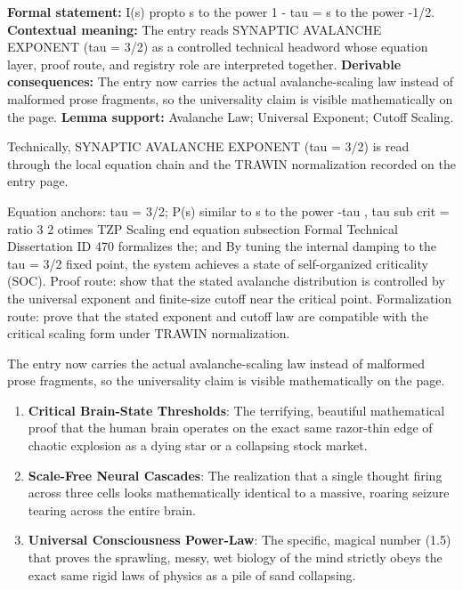 \begingroup\footnotesize\setlength{\emergencystretch}{3em}\sloppy
\textbf{Formal statement:} I(s) propto s to the power 1 - tau = s to the power -1/2. \textbf{Contextual meaning:} The entry reads SYNAPTIC AVALANCHE EXPONENT (tau = 3/2) as a controlled technical headword whose equation layer, proof route, and registry role are interpreted together. \textbf{Derivable consequences:} The entry now carries the actual avalanche-scaling law instead of malformed prose fragments, so the universality claim is visible mathematically on the page. \textbf{Lemma support:} Avalanche Law; Universal Exponent; Cutoff Scaling.\par
\endgroup

Technically, SYNAPTIC AVALANCHE EXPONENT (tau = 3/2) is read through the local equation chain and the TRAWIN normalization recorded on the entry page.

Equation anchors: tau = 3/2; P(s) similar to s to the power -tau , tau sub crit = ratio 3 2 otimes TZP Scaling end equation subsection Formal Technical Dissertation ID 470 formalizes the; and By tuning the internal damping to the tau = 3/2 fixed point, the system achieves a state of self-organized criticality (SOC). Proof route: show that the stated avalanche distribution is controlled by the universal exponent and finite-size cutoff near the critical point. Formalization route: prove that the stated exponent and cutoff law are compatible with the critical scaling form under TRAWIN normalization.

The entry now carries the actual avalanche-scaling law instead of malformed prose fragments, so the universality claim is visible mathematically on the page.
\endgroup

\begin{enumerate}[leftmargin=1.6em,itemsep=6pt,topsep=4pt]
\item \textbf{Critical Brain-State Thresholds}: The terrifying, beautiful mathematical proof that the human brain operates on the exact same razor-thin edge of chaotic explosion as a dying star or a collapsing stock market.
\item \textbf{Scale-Free Neural Cascades}: The realization that a single thought firing across three cells looks mathematically identical to a massive, roaring seizure tearing across the entire brain.
\item \textbf{Universal Consciousness Power-Law}: The specific, magical number (1.5) that proves the sprawling, messy, wet biology of the mind strictly obeys the exact same rigid laws of physics as a pile of sand collapsing.
\end{enumerate}

